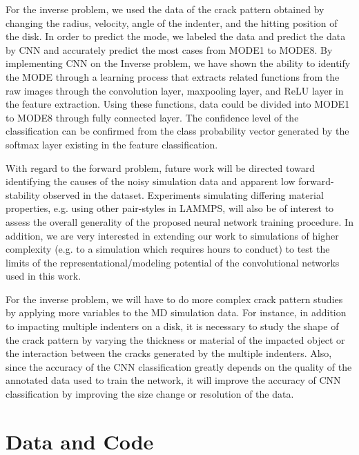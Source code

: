 For the inverse problem, we used the data of the crack pattern obtained by changing the radius, velocity, angle of the indenter, and the hitting position of the disk. In order to predict the mode, we labeled the data and predict the data by CNN and accurately predict the most cases from MODE1 to MODE8. By implementing CNN on the Inverse problem, we have shown the ability to identify the MODE through a learning process that extracts related functions from the raw images through the convolution layer, maxpooling layer, and ReLU layer in the feature extraction. Using these functions, data could be divided into MODE1 to MODE8 through fully connected layer. The confidence level of the classification can be confirmed from the class probability vector generated by the softmax layer existing in the feature classification. 

With regard to the forward problem, future work will be directed toward identifying the causes of the noisy simulation data and apparent low forward-stability observed in the dataset.  Experiments simulating differing material properties, e.g. using other pair-styles in LAMMPS, will also be of interest to assess the overall generality of the proposed neural network training procedure.  In addition, we are very interested in extending our work to simulations of higher complexity (e.g. to a simulation which requires hours to conduct) to test the limits of the representational/modeling potential of the convolutional networks used in this work.

For the inverse problem, we will have to do more complex crack pattern studies by applying more variables to the MD simulation data. For instance, in addition to impacting multiple indenters on a disk, it is necessary to study the shape of the crack pattern by varying the thickness or material of the impacted object or the interaction between the cracks generated by the multiple indenters. Also, since the accuracy of the CNN classification greatly depends on the quality of the annotated data used to train the network, it will improve the accuracy of CNN classification by improving the size change or resolution of the data. 


\section{Data and Code}
\label{sec:6}


